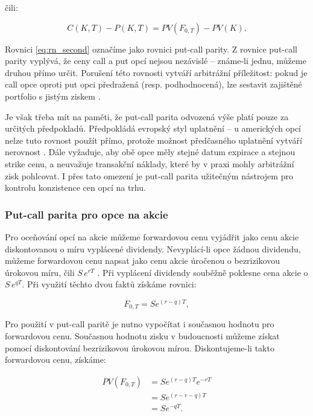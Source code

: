 \documentclass[male,czech,api_bc]{kitheses}
\begin{document}
  čili:

  \begin{equation}
     C(K, T) - P(K, T) = PV(F_{0, T}) - PV(K).
     \label{eq:rn_second}
  \end{equation}

  Rovnici \eqref{eq:rn_second} označíme jako rovnici put-call parity. Z rovnice put-call parity vyplývá, že ceny call a put opcí nejsou nezávislé – známe-li jednu, můžeme druhou přímo určit. Porušení této rovnosti vytváří arbitrážní příležitost: pokud je call opce oproti put opci předražená (resp. podhodnocená), lze sestavit zajištěné portfolio s jistým ziskem \parencites[s.~85]{McDonald2013}. 

  Je však třeba mít na paměti, že put-call parita odvozená výše platí pouze za určitých předpokladů. Předpokládá evropský styl uplatnění – u amerických opcí nelze tuto rovnost použít přímo, protože možnost předčasného uplatnění vytváří nerovnost \parencites[rovnice~11.7]{Hull2021}.
  Dále vyžaduje, aby obě opce měly stejné datum expirace a stejnou strike cenu, a neuvažuje transakční náklady, které by v praxi mohly arbitrážní zisk pohlcovat. I přes tato omezení je put-call parita užitečným nástrojem pro kontrolu konzistence cen opcí na trhu. 


  \subsubsection{Put-call parita pro opce na akcie}

  Pro oceňování opcí na akcie můžeme forwardovou cenu vyjádřit jako cenu akcie diskontovanou o míru vyplácené dividendy. Nevyplácí-li opce žádnou dividendu, můžeme forwardovou cenu napsat jako cenu akcie úročenou o bezrizikovou úrokovou míru, čili $S \, e^{rT}$ \parencites[s.~139]{McDonald2013}. Při vyplácení dividendy souběžně poklesne cena akcie o $S \, e^{qT}$. Při využití těchto dvou faktů získáme rovnici: 

  \begin{equation}
    \label{eq:forw_price}
    F_{0, T} = Se^{(r - q) T},
  \end{equation}

  Pro použití v put-call paritě je nutno vypočítat i současnou hodnotu pro forwardovou cenu. Současnou hodnotu zisku v budoucnosti můžeme získat pomocí diskontování bezrizikovou úrokovou mírou. Diskontujeme-li takto forwardovou cenu, získáme: 

  \begin{align}
    \label{eq:non_forw_price}
    PV(F_{0, T}) &= Se^{(r - q) T}e^{-rT} \\
                 &= Se^{(r - r - q) T} \\
                 &= Se^{- q T}.
  \end{align}
\end{document}
